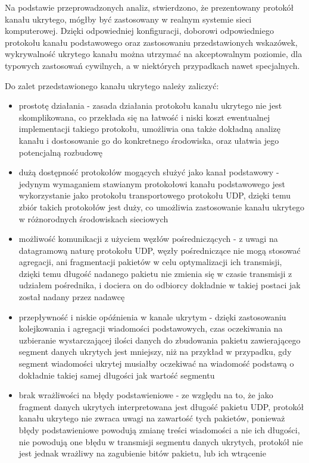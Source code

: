 \documentclass[a4paper, twoside, 12pt]{report}
\begin{document}
    Na podstawie przeprowadzonych analiz, stwierdzono, że prezentowany protokół
    kanału ukrytego, mógłby być zastosowany w realnym systemie sieci komputerowej.
    Dzięki odpowiedniej konfiguracji, doborowi odpowiedniego protokołu kanału
    podstawowego oraz zastosowaniu przedstawionych wskazówek,
    wykrywalność ukrytego kanału można utrzymać na akceptowalnym
    poziomie, dla typowych zastosowań cywilnych, a w niektórych przypadkach nawet specjalnych.

    Do zalet przedstawionego kanału ukrytego należy zaliczyć:
    \begin{itemize}
        \item prostotę działania - zasada działania protokołu kanału ukrytego
            nie jest skomplikowana, co przekłada się na łatwość i niski koszt
            ewentualnej implementacji takiego protokołu, umożliwia ona także
            dokładną analizę kanału i dostosowanie go do konkretnego środowiska,
            oraz ułatwia jego potencjalną rozbudowę
        \item dużą dostępność protokołów mogących służyć jako kanał podstawowy -
            jedynym wymaganiem stawianym protokołowi kanału podstawowego jest
            wykorzystanie jako protokołu transportowego protokołu UDP, dzięki temu
            zbiór takich protokołów jest duży, co umożliwia zastosowanie kanału
            ukrytego w różnorodnych środowiskach sieciowych
        \item możliwość komunikacji z użyciem węzłów pośredniczących - z uwagi
            na datagramową naturę protokołu UDP, węzły pośredniczące nie mogą stosować
            agregacji, ani fragmentacji pakietów w celu optymalizacji ich transmisji,
            dzięki temu długość nadanego pakietu nie zmienia się w czasie transmisji
            z udziałem pośrednika, i dociera on do odbiorcy dokładnie w takiej postaci
            jak został nadany przez nadawcę
        \item przepływność i niskie opóźnienia w  kanale ukrytym - dzięki
            zastosowaniu kolejkowania i agregacji wiadomości podstawowych,
            czas oczekiwania na uzbieranie wystarczającej ilości danych do zbudowania
            pakietu zawierającego segment danych ukrytych jest mniejszy, niż na przykład
            w przypadku, gdy segment wiadomości ukrytej musiałby oczekiwać na
            wiadomość podstawą o dokładnie takiej samej długości jak wartość segmentu
        \item brak wrażliwości na błędy podstawieniowe - ze względu na to, że jako
            fragment danych ukrytych interpretowana jest długość pakietu UDP, protokół
            kanału ukrytego nie zwraca uwagi na zawartość tych pakietów, ponieważ
            błędy podstawieniowe powodują zmianę treści wiadomości a nie ich długości,
            nie powodują one błędu w transmisji segmentu danych ukrytych, protokół
            nie jest jednak wrażliwy na zagubienie bitów pakietu, lub ich wtrącenie
    \end{itemize}
\end{document}

